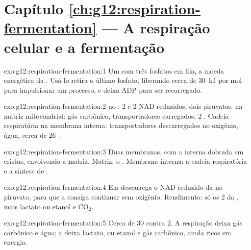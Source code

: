 \section*{Capítulo \ref{ch:g12:respiration-fermentation} --- A respiração celular e a fermentação}

\begin{solution}{exo:g12:respiration-fermentation:1}
Um  com três fosfatos em fila, a moeda energética da .
Usá-lo retira o último fosfato, liberando cerca de \qty{30}{kJ} por mol
para impulsionar um processo, e deixa ADP para ser recarregado.
\end{solution}

\begin{solution}{exo:g12:respiration-fermentation:2}
 no : 2  e 2 NAD reduzidos, dois piruvatos.  na matriz mitocondrial: gás carbônico, transportadores
carregados, 2 . Cadeia respiratória na membrana interna:
transportadores descarregados no oxigênio, água, cerca de 26 .
\end{solution}

\begin{solution}{exo:g12:respiration-fermentation:3}
Duas membranas, com a interna dobrada em cristas, envolvendo a matriz.
Matriz: o . Membrana interna: a cadeia respiratória e a
síntese de .
\end{solution}

\begin{solution}{exo:g12:respiration-fermentation:4}
Ela descarrega o NAD reduzido da  no piruvato, para que a
 consiga continuar sem oxigênio. Rendimento: só os 2  da
, mais lactato ou etanol e $\mathrm{CO_2}$.
\end{solution}

\begin{solution}{exo:g12:respiration-fermentation:5}
Cerca de 30  contra 2. A respiração deixa gás carbônico e água; a
 deixa lactato, ou etanol e gás carbônico, ainda ricos em
energia.
\end{solution}

